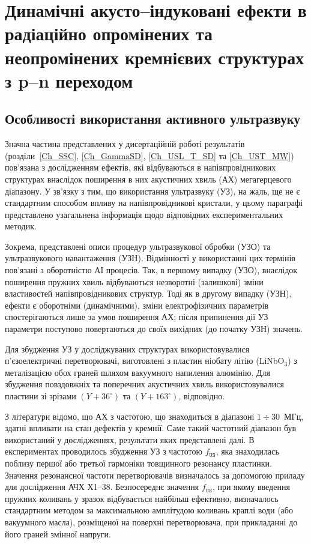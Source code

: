 
\chapter{Динамічні акусто--індуковані ефекти в радіаційно опромінених та неопромінених кремнієвих структурах з p--n переходом\label{Ch_SSC}}


\section{Особливості використання активного ультразвуку}
Значна частина представлених у дисертаційній роботі результатів (розділи~\ref{Ch_SSC}, \ref{Ch_GammaSD}, \ref{Ch_USL_T_SD} та \ref{Ch_UST_MW}) пов'язана з дослідженням ефектів, які відбуваються в напівпровідникових структурах внаслідок
поширення в них акустичних хвиль (АХ) мегагерцевого діапазону.
У зв'язку з тим, що використання ультразвуку (УЗ), на жаль, ще не є стандартним способом впливу на напівпровідникові кристали,
у цьому параграфі представлено узагальнена  інформація щодо відповідних експериментальних методик.

Зокрема, представлені описи процедур ультразвукової обробки (УЗО) та ультразвукового навантаження (УЗН).
Відмінності у використанні цих термінів пов'язані з оборотністю АІ процесів.
Так, в першому випадку (УЗО), внаслідок поширення пружних хвиль відбуваються незворотні (залишкові) зміни властивостей напівпровідникових структур.
Тоді як в другому випадку (УЗН), ефекти є оборотніми (динамічними), зміни електрофізичних параметрів спостерігаються лише за умов поширення АХ;
після припинення дії УЗ параметри поступово повертаються до своїх вихідних (до початку УЗН) значень.

Для збудження УЗ у досліджуваних структурах використовувалися п'єзоелектричні перетворювачі,
виготовлені з пластин ніобату літію (LiNbO$_3$) з металізацією обох граней шляхом вакуумного напилення алюмінію.
Для збудження повздовжніх та поперечних акустичних хвиль використовувалися пластини зі зрізами $(Y\!+\!36^\circ)$ та $(Y\!+\!163^\circ)$, відповідно.

З літератури \cite{Ostapenko1995,Davletova2008,Davletova2009,Pashaev2014r} відомо, що АХ з частотою, що знаходиться в діапазоні $1\div30$~МГц, здатні впливати на стан дефектів у кремнії.
Саме такий частотний діапазон був використаний у дослідженнях, результати яких представлені далі.
В експериментах проводилось збудження УЗ з частотою $f_\mathtt{US}$, яка знаходилась поблизу першої або третьої гармоніки товщинного резонансу пластинки.
Значення резонансної частоти перетворювачів визначалось за допомогою приладу для дослідження АЧХ Х1--38.
Безпосереднє значення $f_\mathtt{US}$, при якому введення пружних коливань у зразок відбувається найбільш ефективно, визначалось стандартним методом за максимальною амплітудою коливань краплі води (або вакуумного масла), розміщеної на поверхні перетворювача, при прикладанні до його граней змінної напруги.

